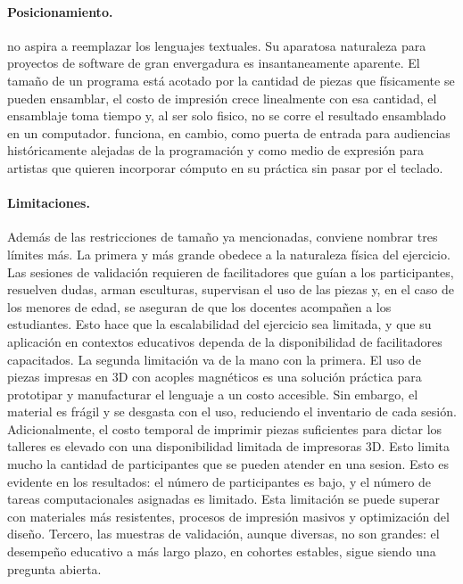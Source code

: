 \paragraph{Posicionamiento.}
\sculpt no aspira a reemplazar los lenguajes textuales. Su aparatosa naturaleza para proyectos de software
de gran envergadura es insantaneamente aparente. El tama\~no de un programa est\'a acotado por la
cantidad de piezas que f\'isicamente se pueden ensamblar, el costo de
impresi\'on crece linealmente con esa cantidad, el ensamblaje toma
tiempo y, al ser solo fisico, no se corre el resultado ensamblado en un computador.
\sculpt funciona, en cambio, como puerta
de entrada para audiencias hist\'oricamente alejadas de la
programaci\'on y como medio de expresi\'on para artistas que quieren
incorporar c\'omputo en su pr\'actica sin pasar por el teclado.

\paragraph{Limitaciones.}
Adem\'as de las restricciones de tama\~no ya mencionadas, conviene
nombrar tres l\'imites m\'as. La primera y m\'as grande obedece a la naturaleza f\'isica del ejercicio.
Las sesiones de validaci\'on requieren de facilitadores que gu\'ian a los participantes,
resuelven dudas, arman esculturas, supervisan el uso de las piezas y, en el caso de los menores de edad,
se aseguran de que los docentes acompa\~nen a los estudiantes. Esto hace que la escalabilidad
del ejercicio sea limitada, y que su aplicaci\'on en contextos educativos dependa de la 
disponibilidad de facilitadores capacitados.
La segunda limitaci\'on va de la mano con la primera. El uso de piezas impresas en 3D con acoples
magn\'eticos es una soluci\'on pr\'actica para prototipar y manufacturar el lenguaje a un costo accesible. Sin embargo,
el material es fr\'agil y se desgasta con el uso, reduciendo el inventario de cada sesi\'on.
Adicionalmente, el costo temporal de imprimir piezas suficientes para dictar los talleres es elevado con una 
disponibilidad limitada de impresoras 3D.
Esto limita mucho la cantidad de participantes que se pueden atender en una sesion.
Esto es evidente en los resultados: el n\'umero de participantes es bajo, y el n\'umero de tareas computacionales asignadas es limitado.
Esta limitaci\'on se puede superar con materiales m\'as resistentes, procesos de impresi\'on
masivos y optimización del dise\~no.
Tercero, las muestras de validaci\'on, aunque diversas, no son grandes: el desempe\~no
educativo a m\'as largo plazo, en cohortes estables, sigue siendo
una pregunta abierta.

\endinput
